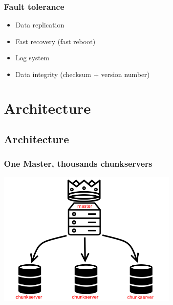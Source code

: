 \documentclass{beamer}
\newcommand{\slideheight}{6.7cm}
\begin{document}
\begin{frame}
 \frametitle{Fault tolerance}
 \begin{itemize}
  \item \alert{Data replication}
  \item \alert{Fast recovery} (fast reboot)
  \item \alert{Log system}
  \item \alert{Data integrity} (checksum + version number)
 \end{itemize}
\end{frame}

\section{Architecture}
\subsection{Architecture}
\begin{frame}
 \frametitle{One Master, thousands chunkservers}
 \centering
 \includegraphics[height=\slideheight]{figures/masterschema.png}
\end{frame}
\end{document}
